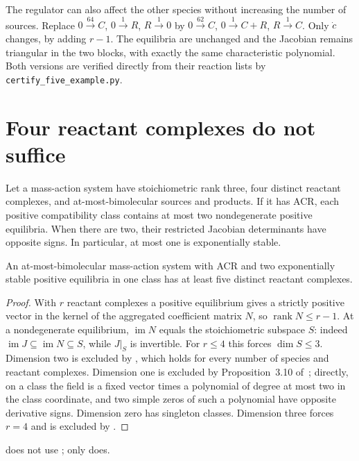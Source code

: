 \documentclass[11pt,a4paper]{report}
\providecommand{\rank}{\operatorname{rank}}
\providecommand{\im}{\operatorname{im}}
\begin{document}
The regulator can also affect the other species without increasing the number of sources. Replace
$0\xrightarrow{64}C$, $0\xrightarrow1 R$, $R\xrightarrow1 0$ by
$0\xrightarrow{62}C$, $0\xrightarrow1 C+R$, $R\xrightarrow1 C$.
Only $\dot c$ changes, by adding $r-1$. The equilibria are unchanged and the Jacobian remains
triangular in the two blocks, with exactly the same characteristic polynomial. Both versions are
verified directly from their reaction lists by \texttt{certify\_five\_example.py}.

\section{Four reactant complexes do not suffice}\label{sec:four}
\begin{theorem}\label{thm:rank-three}
Let a mass-action system have stoichiometric rank three, four distinct reactant complexes, and
at-most-bimolecular sources and products. If it has ACR, each positive compatibility class contains at most
two nondegenerate positive equilibria. When there are two, their restricted Jacobian determinants have
opposite signs. In particular, at most one is exponentially stable.
\end{theorem}

\begin{corollary}\label{cor:five}
An at-most-bimolecular mass-action system with ACR and two exponentially stable positive equilibria in one
class has at least five distinct reactant complexes.
\end{corollary}
\begin{proof}
With $r$ reactant complexes a positive equilibrium gives a strictly positive vector in the kernel of
the aggregated coefficient matrix $N$, so $\rank N\le r-1$. At a nondegenerate equilibrium,
$\im N$ equals the stoichiometric subspace $S$: indeed $\im J\subseteq\im N\subseteq S$, while
$J|_S$ is invertible. For $r\le4$ this forces $\dim S\le3$. Dimension two is excluded by
, which holds for every number of species and reactant
complexes. Dimension one is excluded by Proposition~3.10 of~\autocite{KNS2024}; directly, on a class the
field is a fixed vector times a polynomial of degree at most two in the class coordinate, and two
simple zeros of such a polynomial have opposite derivative signs. Dimension zero has singleton classes.
Dimension three forces $r=4$ and is excluded by .
\end{proof}
 does not use ; only  does.
\end{document}
